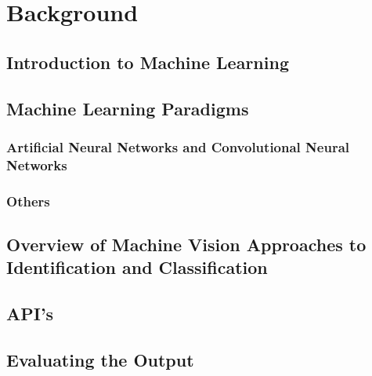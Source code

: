 \chapter{Background}
\label{background}

\section{Introduction to Machine Learning}

\section{Machine Learning Paradigms}
\subsection{Artificial Neural Networks and Convolutional Neural Networks}
\subsection{Others}

\section{Overview of Machine Vision Approaches to Identification and Classification}

\section{API's}

\section{Evaluating the Output}

